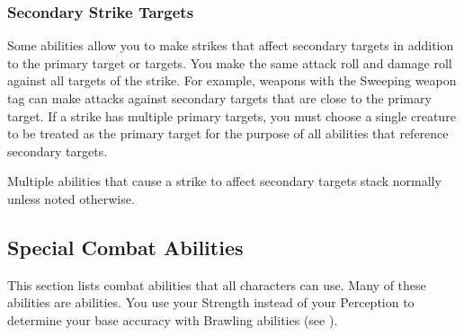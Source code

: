         \subsubsection{Secondary Strike Targets}\label{Secondary Strike Targets}
            Some abilities allow you to make strikes that affect secondary targets in addition to the primary target or targets.
            You make the same attack roll and damage roll against all targets of the strike.
            For example, weapons with the Sweeping weapon tag can make attacks against secondary targets that are close to the primary target.
            If a strike has multiple primary targets, you must choose a single creature to be treated as the primary target for the purpose of all abilities that reference secondary targets.

            Multiple abilities that cause a strike to affect secondary targets stack normally unless noted otherwise.

    \subsection{Special Combat Abilities}\label{Special Combat Abilities}

        This section lists combat abilities that all characters can use.
        Many of these abilities are  abilities.
        You use your Strength instead of your Perception to determine your base accuracy with Brawling abilities (see ).

